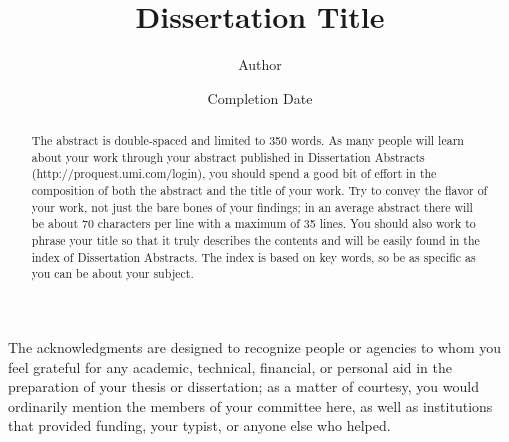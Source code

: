 \documentclass{iuphd}
\begin{document}
\title{Dissertation Title}
\author{Author}
\date{Completion Date}
\maketitle

\acceptancepage



\begin{acknowledgments}
The acknowledgments are designed to recognize people or agencies to whom you feel grateful for any academic,
technical, financial, or personal aid in the preparation of your thesis or dissertation; as a matter of
courtesy, you would ordinarily mention the members of your committee here, as well as institutions that
provided funding, your typist, or anyone else who helped.
\end{acknowledgments}


\begin{abstract}
 The abstract is double-spaced and limited to 350 words. As many people will learn about
your work through your abstract published in Dissertation Abstracts (http://proquest.umi.com/login),
you should spend a good bit of effort in the composition of both the abstract and the title of your work.
Try to convey the flavor of your work, not just the bare bones of your findings; in an average abstract
there will be about 70 characters per line with a maximum of 35 lines. You should also work to phrase your
title so that it truly describes the contents and will be easily found in the index of Dissertation Abstracts.
The index is based on key words, so be as specific as you can be about your subject. 
\end{abstract}

\tableofcontents






% 
% 
\end{document}
